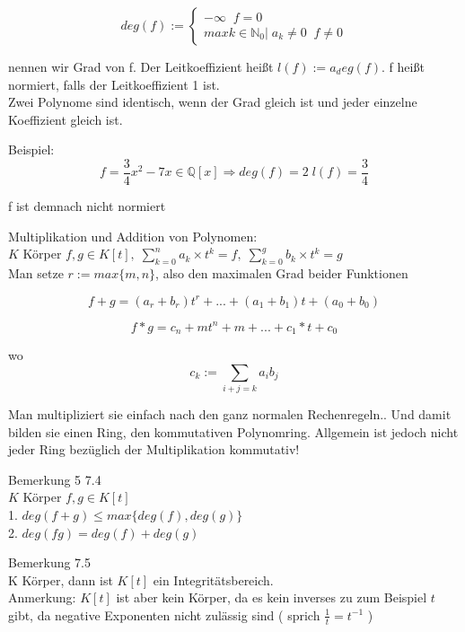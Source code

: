\documentclass[headsepline,12pt,a4paper]{scrartcl}
\begin{document}
\item $$ \textit{deg}(f):=\begin{cases} - \infty \; \; f = 0 \\
max{k \in \mathbb{N}_0 | \; a_k \neq 0}    \; \; f \neq 0 
\end{cases}$$

nennen wir Grad von f. Der Leitkoeffizient heißt $l(f):=a_deg(f)$. f heißt normiert, falls der Leitkoeffizient 1 ist. \\

Zwei Polynome sind identisch, wenn der Grad gleich ist und jeder einzelne Koeffizient gleich ist. \\

\item Beispiel: \\
$$ f = \frac{3}{4}x^2 -7x \in \mathbb{Q}[x] \Rightarrow deg(f) = 2  \; l(f) = \frac{3}{4} $$

f ist demnach nicht normiert

\newpage


\item Multiplikation und Addition von Polynomen:\\
$ K $ Körper $ f,g \in K[t] ,   \;  \sum\limits_{k=0}^n a_k \times t^k = f , \;  \sum\limits_{k=0}^g b_k \times t^k = g $ \\

Man setze $r:= max\{m,n\}$, also den maximalen Grad beider Funktionen

$$ f+g = (a_r+b_r)t^r+...+(a_1+b_1)t+(a_0+b_0) $$

$$ f*g = c_n+m t^n+m + ... + c_1 * t + c_0 $$

wo $$ c_k:= \sum\limits_{i+j=k} a_i b_j $$

Man multipliziert sie einfach nach den ganz normalen Rechenregeln.. Und damit bilden sie einen Ring, den kommutativen Polynomring. Allgemein ist jedoch nicht jeder Ring bezüglich der Multiplikation kommutativ! \\

\item Bemerkung 5 7.4 \\
$ K $ Körper $ f,g \in K[t] $ \\

1. $deg(f+g) \leq max \{deg(f),deg(g)\} $ \\
2. $ deg(fg) = deg(f)+deg(g) $ \\

\item Bemerkung 7.5 \\
K Körper, dann ist $K[t]$ ein Integritätsbereich.  \\
Anmerkung: $K[t]$ ist aber kein Körper, da es kein inverses zu zum Beispiel $t$ gibt, da negative Exponenten nicht zulässig sind ( sprich $ \frac{1}{t} = t^{-1} $ )
\end{document}

